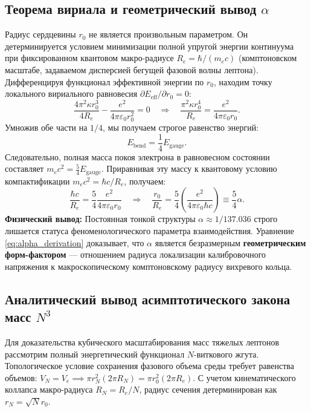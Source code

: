 \documentclass[11pt,a4paper]{article}
\begin{document}
\subsection{Теорема вириала и геометрический вывод $\alpha$}
Радиус сердцевины $r_0$ не является произвольным параметром. Он детерминируется условием минимизации полной упругой энергии континуума при фиксированном квантовом макро-радиусе $R_e = \hbar / (m_e c)$ (комптоновском масштабе, задаваемом дисперсией бегущей фазовой волны лептона).
Дифференцируя функционал эффективной энергии по $r_0$, находим точку локального вириального равновесия $\partial E_{\text{eff}} / \partial r_0 = 0$:
\begin{equation}
\frac{4 \pi^2 \kappa r_0^3}{4R_e} - \frac{e^2}{4\pi\varepsilon_0 r_0^2} = 0 \quad \Longrightarrow \quad \frac{\pi^2 \kappa r_0^4}{R_e} = \frac{e^2}{4\pi\varepsilon_0 r_0}.
\end{equation}
Умножив обе части на $1/4$, мы получаем строгое равенство энергий:
\begin{equation}
E_{\text{bend}} = \frac{1}{4} E_{\text{gauge}}.
\end{equation}
Следовательно, полная масса покоя электрона в равновесном состоянии составляет $m_e c^2 = \frac{5}{4} E_{\text{gauge}}$. Приравнивая эту массу к квантовому условию компактификации $m_e c^2 = \hbar c / R_e$, получаем:
\begin{equation}
\frac{\hbar c}{R_e} = \frac{5}{4} \frac{e^2}{4\pi\varepsilon_0 r_0} \quad \Longrightarrow \quad \frac{r_0}{R_e} = \frac{5}{4} \left( \frac{e^2}{4\pi\varepsilon_0 \hbar c} \right) \equiv \frac{5}{4} \alpha.
\label{eq:alpha_derivation}
\end{equation}
\textbf{Физический вывод:} Постоянная тонкой структуры $\alpha \approx 1/137.036$ строго лишается статуса феноменологического параметра взаимодействия. Уравнение \eqref{eq:alpha_derivation} доказывает, что $\alpha$ является безразмерным \textbf{геометрическим форм-фактором} — отношением радиуса локализации калибровочного напряжения к макроскопическому комптоновскому радиусу вихревого кольца.

\subsection{Аналитический вывод асимптотического закона масс $N^3$}
Для доказательства кубического масштабирования масс тяжелых лептонов рассмотрим полный энергетический функционал $N$-виткового жгута. Топологическое условие сохранения фазового объема среды требует равенства объемов: $V_N = V_e \implies \pi r_N^2 (2\pi R_N) = \pi r_0^2 (2\pi R_e)$. С учетом кинематического коллапса макро-радиуса $R_N = R_e / N$, радиус сечения детерминирован как $r_N = \sqrt{N} r_0$.
\end{document}
